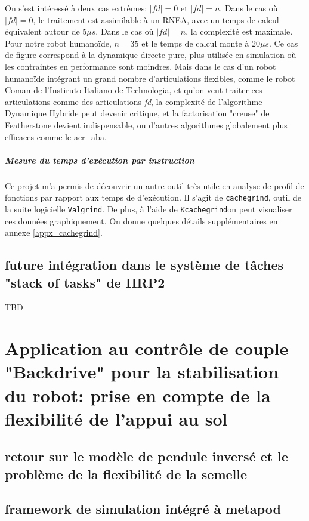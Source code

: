 \documentclass{report}
\begin{document}
On s'est intéressé à deux cas extrêmes: $|fd|=0$ et $|fd|=n$. Dans le cas où $|fd|=0$, le traitement est assimilable à un RNEA, avec un temps de calcul équivalent autour de $5\mu s$. Dans le cas où $|fd|=n$, la complexité est maximale. Pour notre robot humanoïde, $n=35$ et le temps de calcul monte à $20\mu s$. Ce cas de figure correspond à la dynamique directe pure, plus utilisée en simulation où les contraintes en performance sont moindres. Mais dans le cas d'un robot humanoïde intégrant un grand nombre d'articulations flexibles, comme le robot Coman de l'Instiruto Italiano de Technologia, et qu'on veut traiter ces articulations comme des articulations \emph{fd}, la complexité de l'algorithme Dynamique Hybride peut devenir critique, et la factorisation "creuse" de Featherstone devient indispensable, ou d'autres algorithmes globalement plus efficaces comme le \gls{acr_aba}.


\paragraph{Mesure du temps d'exécution par instruction}
Ce projet m'a permis de découvrir un autre outil très utile en analyse de profil de fonctions par rapport aux temps de d'exécution. Il s'agit de \verb;cachegrind;, outil de la suite logicielle \verb;Valgrind;. De plus, à l'aide de \verb;Kcachegrind;on peut visualiser ces données graphiquement. On donne quelques détails supplémentaires en annexe \ref{appx_cachegrind}.


\section{future intégration dans le système de tâches "stack of tasks" de HRP2}

TBD

\chapter{Application au contrôle de couple "Backdrive" pour la stabilisation du robot: prise en compte de la flexibilité de l'appui au sol}

\section{retour sur le modèle de pendule inversé et le problème de la flexibilité de la semelle}

\section{framework de simulation intégré à metapod}
\end{document}
